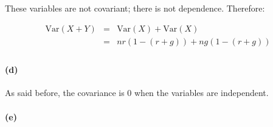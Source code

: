 \documentclass[a4paper]{article}
\begin{document}
These variables are not covariant; there is not dependence. Therefore:

\begin{equation}
\begin{array}{rll}
\mbox{Var}(X+Y) & = & \mbox{Var}(X) + \mbox{Var}(X) \\
& = & nr(1-(r+g)) + ng(1-(r+g)) \\
\end{array}
\end{equation}

\paragraph{(d)}

As said before, the covariance is 0 when the variables are independent.

\paragraph{(e)}
\end{document}
